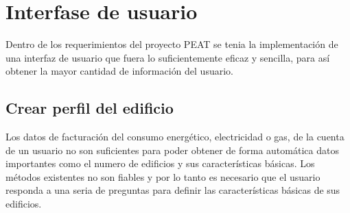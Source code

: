 \section{Interfase de usuario}
Dentro de los requerimientos del proyecto PEAT se tenia la implementación de una
interfaz de usuario que fuera lo suficientemente eficaz y sencilla, para así obtener
la mayor cantidad de información del usuario.

\subsection{Crear perfil del edificio}

Los datos de facturación del consumo energético, electricidad o gas, de la cuenta
de un usuario no son suficientes para poder obtener de forma automática datos
importantes como el numero de edificios y sus características básicas.
Los métodos existentes no son fiables y por lo tanto es necesario que el usuario
responda a una seria de preguntas para definir las características básicas
de sus edificios.

